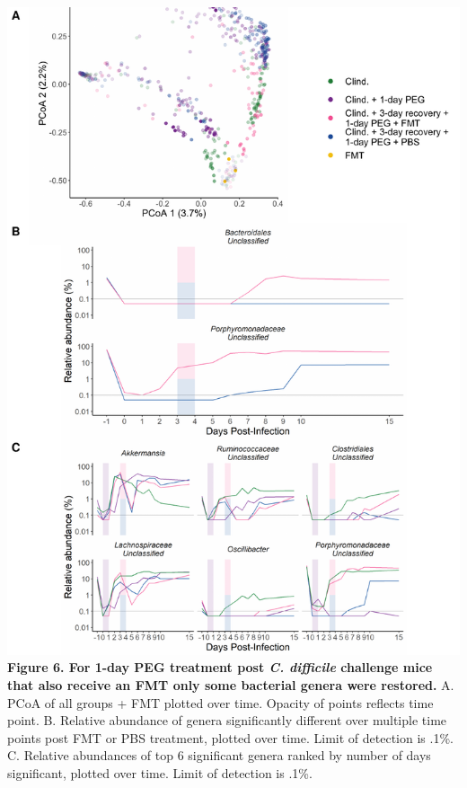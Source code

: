\documentclass[
  11pt,
]{article}
\begin{document}
\includegraphics{figure_6.pdf} \textbf{Figure 6. For 1-day PEG treatment
post \emph{C. difficile} challenge mice that also receive an FMT only
some bacterial genera were restored.} A. PCoA of all groups + FMT
plotted over time. Opacity of points reflects time point. B. Relative
abundance of genera significantly different over multiple time points
post FMT or PBS treatment, plotted over time. Limit of detection is
.1\%. C. Relative abundances of top 6 significant genera ranked by
number of days significant, plotted over time. Limit of detection is
.1\%.

\newpage
\end{document}
